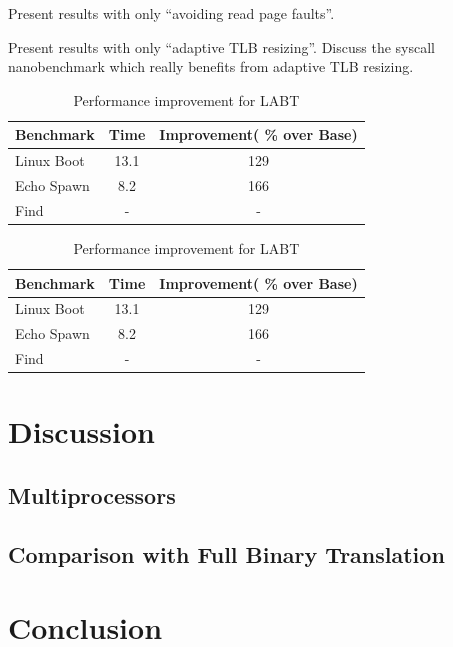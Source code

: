 \documentclass[10pt,twocolumn]{article}
\begin{document}
Present results with only ``avoiding read page faults''.

Present results with only ``adaptive TLB resizing''. Discuss the syscall nanobenchmark
which really benefits from adaptive TLB resizing.

\begin{table}[!b]
\centering
\caption{Performance improvement for LABT}
     \begin{tabular}{lcc} \hline
       Benchmark  & Time & Improvement( \% over Base)  \\ \hline
       Linux Boot & 13.1 & 129  \\
       Echo Spawn & 8.2 & 166  \\
       Find & - & -  \\
       \hline
     \end{tabular}
\label{tab:ExpWithout1}
\end{table}

\begin{table}[!b]
\centering
\caption{Performance improvement for LABT}
     \begin{tabular}{lcc} \hline
       Benchmark  & Time & Improvement( \% over Base)  \\ \hline
       Linux Boot & 13.1 & 129  \\
       Echo Spawn & 8.2 & 166  \\
       Find & - & -  \\
       \hline
     \end{tabular}
\label{tab:ExpWithout2}
\end{table}

\section{Discussion}
\subsection{Multiprocessors}
\subsection{Comparison with Full Binary Translation}
\section{Conclusion}



\end{document}
